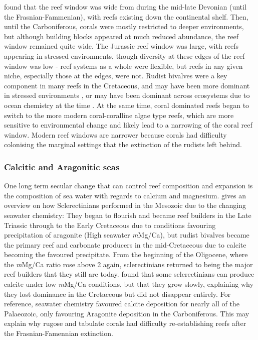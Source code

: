 \documentclass[11pt,a4paper]{article}
\begin{document}
\cite{Leinfelder1999} found that the reef window was wide from during the mid-late Devonian (until the Frasnian-Fammenian), with reefs existing down the continental shelf.
 Then, until the Carboniferous, corals were mostly restricted to deeper environments, but although building blocks appeared at much reduced abundance, the reef window remained quite wide.
 The Jurassic reef window was large, with reefs appearing in stressed environments, though diversity at these edges of the reef window was low - reef systems as a whole were flexible, but reefs in any given niche, especially those at the edges, were not.
 Rudist bivalves were a key component in many reefs in the Cretaceous, and may have been more dominant in stressed environments \citep{Leinfelder1999}, or may have been dominant across ecosystems due to ocean chemistry at the time \citep{Ries2006}.
 At the same time, coral dominated reefs began to switch to the more modern coral-coralline algae type reefs, which are more sensitive to environmental change and likely lead to a narrowing of the coral reef window.
 Modern reef windows are narrower because corals had difficulty colonising the marginal settings that the extinction of the rudists left behind.

\subsubsection{Calcitic and Aragonitic seas}
One long term secular change that can control reef composition and expansion is the composition of sea water with regards to calcium and magnesium.
 \cite{Ries2006} gives an overview on how Sclerectinians performed in the Mesozoic due to the changing seawater chemistry: They began to flourish and became reef builders in the Late Triassic through to the Early Cretaceous due to conditions favouring precipitation of aragonite (High seawater \textit{m}Mg/Ca), but rudist bivalves became the primary reef and carbonate producers in the mid-Cretaceous due to calcite becoming the favoured precipitate.
 From the beginning of the Oligocene, where the \textit{m}Mg/Ca ratio rose above 2 again, sclerectinians returned to being the major reef builders that they still are today.
 \cite{Ries2006} found that some sclerectinians can produce calcite under low \textit{m}Mg/Ca conditions, but that they grow slowly, explaining why they lost dominance in the Cretaceous but did not disappear entirely.
 For reference, seawater chemistry favoured calcite deposition for nearly all of the Palaeozoic, only favouring Aragonite deposition in the Carboniferous.
 This may explain why rugose and tabulate corals had difficulty re-establishing reefs after the Frasnian-Famennian extinction.
\end{document}
